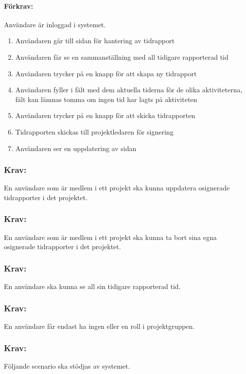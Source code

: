 \documentclass[paper=a4, fontsize=11pt,twoside]{article}
\begin{document}
\paragraph{Förkrav:}
Användare är inloggad i systemet.
\begin{enumerate}
\item Användaren går till sidan för hantering av tidrapport
\item Användaren får se en sammanställning med all tidigare rapporterad tid
\item Användaren trycker på en knapp för att skapa ny tidrapport
\item Användaren fyller i fält med dem aktuella tiderna för de olika aktiviteterna, fält kan lämnas tomma om ingen tid har lagts på aktiviteten
\item	Användaren trycker på en knapp för att skicka tidrapporten
\item Tidrapporten skickas till projektledaren för signering
\item Användaren ser en uppdatering av sidan
\end{enumerate}

\subsubsection{Krav:} En användare som är medlem i ett projekt ska kunna uppdatera osignerade tidrapporter i det projektet.

\subsubsection{Krav:} En användare som är medlem i ett projekt ska kunna ta bort sina egna osignerade tidrapporter i det projektet.

\subsubsection{Krav:}En användare ska kunna se all sin tidigare rapporterad tid.

\subsubsection{Krav:}En användare får endast ha ingen eller en roll i projektgruppen.

\subsubsection{Krav:} Följande scenario ska stödjas av systemet.
\end{document}
